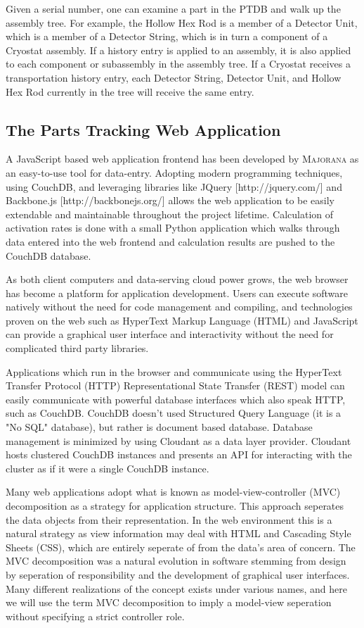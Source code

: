 \documentclass[journal]{IEEEtran}
\begin{document}
Given a serial number, one can examine a part in the PTDB and walk up the assembly tree. For example, the Hollow Hex Rod is a member
of a Detector Unit, which is a member of a Detector String, which is in turn a component of a Cryostat assembly.
If a history entry is applied to an assembly, it is also applied to each component or sub\-assembly in the assembly tree. If a Cryostat receives
a transportation history entry, each Detector String, Detector Unit, and Hollow Hex Rod currently in the tree will receive the same entry.

\subsection{The Parts Tracking Web Application}
A JavaScript based web application frontend has been developed by \textsc{Majorana} as an easy-to-use tool for data-entry.
Adopting modern programming techniques, using CouchDB, and leveraging libraries like JQuery [http://jquery.com/] and Backbone.js [http://backbonejs.org/] allows the
web application to be easily extendable and maintainable throughout the project lifetime. Calculation of
activation rates is done with a small Python application which walks through data entered into the web
frontend and calculation results are pushed to the CouchDB database.

As both client computers and data-serving cloud power grows, the web browser has become a
platform for application development. Users can execute software natively without
the need for code management and compiling, and technologies proven on the web such as HyperText Markup Language (HTML)
and JavaScript can provide a graphical user interface and interactivity without the need
for complicated third party libraries. 

Applications which run in the browser and communicate using the HyperText Transfer Protocol (HTTP) Representational State Transfer
(REST) model can easily communicate with powerful database interfaces which also speak HTTP, such as
CouchDB. CouchDB doesn't used Structured Query Language (it is a "No SQL" database), but 
rather is document based database.
Database management is minimized by using Cloudant as a data layer provider. Cloudant
hosts clustered CouchDB instances and presents an API for interacting with the cluster
as if it were a single CouchDB instance.

Many web applications adopt what is known as model-view-controller (MVC) decomposition
as a strategy for application structure. This approach seperates the data objects from
their representation. In the web environment this is a natural strategy as view information
may deal with HTML and Cascading Style Sheets (CSS), which are entirely seperate of from the data's area of concern.
The MVC decomposition was a natural evolution in software stemming from design by
seperation of responsibility and the development of graphical user interfaces. Many different realizations
of the concept exists under various names, and here we will use the term MVC decomposition to imply
a model-view seperation without specifying a strict controller role.
\end{document}
